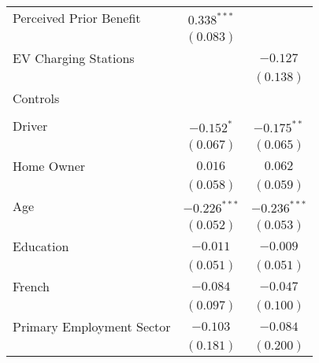 \begin{center}
\begin{tiny}
\begin{longtable}{l@{} c@{} c@{}}
\quad Perceived Prior Benefit                                            & $0.338^{***}$    &                \\
                                                                         & $(0.083)$        &                \\
\quad EV Charging Stations                                               &                  & $-0.127$       \\
                                                                         &                  & $(0.138)$      \\
Controls                                                                 &                  &                \\
                                                                         &                  &                \\
\quad Driver                                                             & $-0.152^{*}$     & $-0.175^{**}$  \\
                                                                         & $(0.067)$        & $(0.065)$      \\
\quad Home Owner                                                         & $0.016$          & $0.062$        \\
                                                                         & $(0.058)$        & $(0.059)$      \\
\quad Age                                                                & $-0.226^{***}$   & $-0.236^{***}$ \\
                                                                         & $(0.052)$        & $(0.053)$      \\
\quad Education                                                          & $-0.011$         & $-0.009$       \\
                                                                         & $(0.051)$        & $(0.051)$      \\
\quad French                                                             & $-0.084$         & $-0.047$       \\
                                                                         & $(0.097)$        & $(0.100)$      \\
\quad Primary Employment Sector                                          & $-0.103$         & $-0.084$       \\
                                                                         & $(0.181)$        & $(0.200)$      \\

\end{longtable}
\end{tiny}
\end{center}
